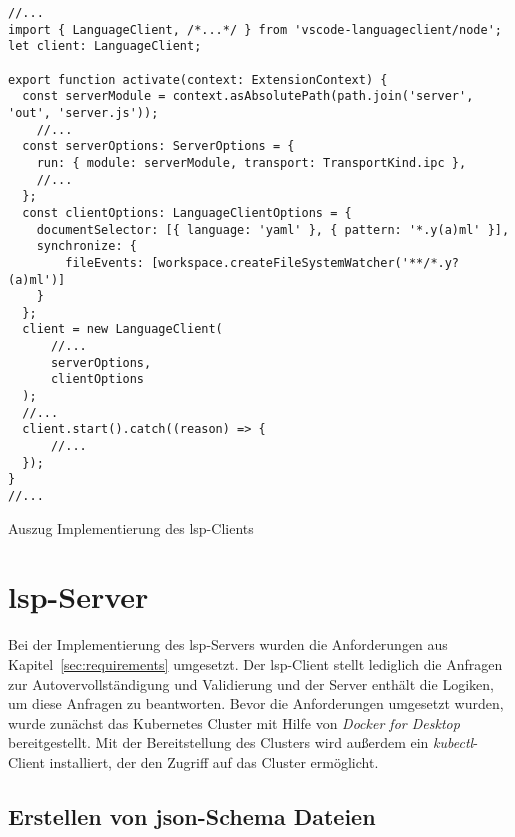 \begin{listing}[htp]
  \begin{verbatim}
//...
import { LanguageClient, /*...*/ } from 'vscode-languageclient/node';
let client: LanguageClient;
      
export function activate(context: ExtensionContext) {
  const serverModule = context.asAbsolutePath(path.join('server', 'out', 'server.js'));
    //...
  const serverOptions: ServerOptions = {
    run: { module: serverModule, transport: TransportKind.ipc },
    //...
  };
  const clientOptions: LanguageClientOptions = {
    documentSelector: [{ language: 'yaml' }, { pattern: '*.y(a)ml' }],
    synchronize: {
        fileEvents: [workspace.createFileSystemWatcher('**/*.y?(a)ml')]
    }
  };
  client = new LanguageClient(
      //...
      serverOptions,
      clientOptions
  );
  //...
  client.start().catch((reason) => {
      //...
  });
}
//...
      \end{verbatim}
  \caption{Auszug Implementierung des \acs{lsp}-Clients}
  \label{lst:client-code}
\end{listing}

\section{\acs{lsp}-Server}

Bei der Implementierung des \ac{lsp}-Servers wurden die Anforderungen aus Kapitel~\ref{sec:requirements} umgesetzt.
Der \acs{lsp}-Client stellt lediglich die Anfragen zur Autovervollständigung und Validierung und der Server enthält die Logiken,
um diese Anfragen zu beantworten.
Bevor die Anforderungen umgesetzt wurden, wurde zunächst das Kubernetes Cluster
mit Hilfe von \textit{Docker for Desktop} bereitgestellt. Mit der Bereitstellung des Clusters wird außerdem
ein \textit{kubectl}-Client installiert, der den Zugriff auf das Cluster ermöglicht.

\subsection{Erstellen von \acs{json}-Schema Dateien}

